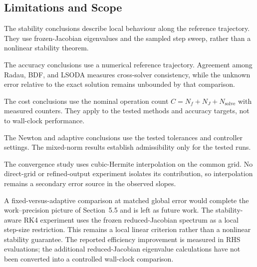 \subsection{Limitations and Scope}
The stability conclusions describe local behaviour along the reference trajectory. They use frozen-Jacobian eigenvalues and the sampled step sweep, rather than a nonlinear stability theorem.

The accuracy conclusions use a numerical reference trajectory. Agreement among Radau, BDF, and LSODA measures cross-solver consistency, while the unknown error relative to the exact solution remains unbounded by that comparison.

The cost conclusions use the nominal operation count $C=N_f+N_J+N_{\mathrm{solve}}$ with measured counters. They apply to the tested methods and accuracy targets, not to wall-clock performance.

The Newton and adaptive conclusions use the tested tolerances and controller settings. The mixed-norm results establish admissibility only for the tested runs.

The convergence study uses cubic-Hermite interpolation on the common grid. No direct-grid or refined-output experiment isolates its contribution, so interpolation remains a secondary error source in the observed slopes.

A fixed-versus-adaptive comparison at matched global error would complete the work--precision picture of Section~5.5 and is left as future work. The stability-aware RK4 experiment uses the frozen reduced-Jacobian spectrum as a local step-size restriction. This remains a local linear criterion rather than a nonlinear stability guarantee. The reported efficiency improvement is measured in RHS evaluations; the additional reduced-Jacobian eigenvalue calculations have not been converted into a controlled wall-clock comparison.
